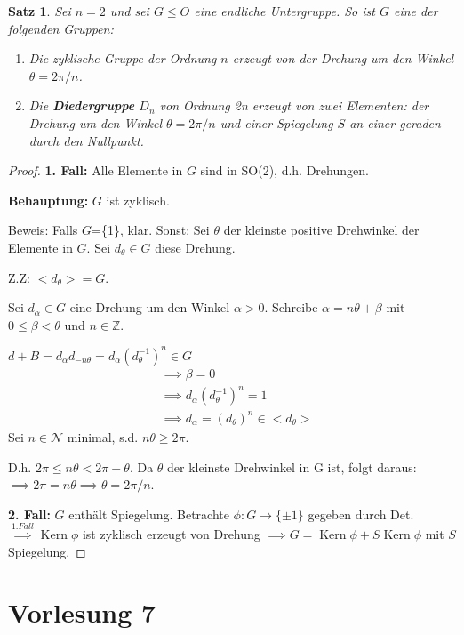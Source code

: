 \documentclass{article}
\theoremstyle{plain}
\newtheorem{theorem}{Satz}
\renewcommand{\ker}{\mathop{\mathrm{Kern}}}
\newcommand{\defn}[1]{\textbf{#1}}
\newcommand{\Z}{\mathbb{Z}}
\newcommand{\N}{\mathcal{N}}
\newcommand{\ug}{\leq}
\newcommand{\zykl}[1]{{<}{#1}{>}}
\begin{document}
\begin{theorem}
    Sei $n=2$ und sei $G\ug O$ eine endliche Untergruppe. 
    So ist $G$ eine der folgenden Gruppen:
    \begin{enumerate}[label=(\alph*)]
        \item Die zyklische Gruppe der Ordnung $n$ erzeugt von der Drehung um den Winkel $\theta=2\pi/n$.
        \item Die \defn{Diedergruppe } $D_n$ von Ordnung 2n erzeugt von zwei Elementen: der Drehung um den Winkel $\theta=2\pi/n$ und einer Spiegelung $S$ an einer geraden durch den Nullpunkt.
    \end{enumerate}
\end{theorem}
\begin{proof}
    \textbf{1. Fall:} Alle Elemente in $G$ sind in SO(2), d.h. Drehungen. %
    
    \textbf{Behauptung:} $G$ ist zyklisch.
    
    Beweis: Falls $G$=\{1\}, klar.
    Sonst: Sei $\theta$ der kleinste positive Drehwinkel der Elemente in $G$. Sei $d_\theta\in G$ diese Drehung.
    
    Z.Z: $\zykl{d_\theta}=G$.

    Sei $d_\alpha\in G$ eine Drehung um den Winkel $\alpha>0$. 
    Schreibe $\alpha=n\theta+\beta$ mit $0\leq\beta<\theta$ und $n\in\Z$.

    $d+B=d_\alpha d_{-n\theta}=d_\alpha(d_\theta^{-1})^n\in G$
    \begin{align*}
        &\implies \beta=0\\
        &\implies d_\alpha(d_\theta^{-1})^n=1\\
        &\implies d_\alpha=(d_\theta)^n\in\zykl{d_\theta}
    \end{align*}
    Sei $n\in\N$ minimal, s.d. $n\theta\geq2\pi$.
    
    D.h. $2\pi\leq n\theta<2\pi+\theta$.
    Da $\theta$ der kleinste Drehwinkel in G ist, folgt daraus:
    $\implies 2\pi=n\theta\implies\theta=2\pi/n$.


    \textbf{2. Fall:} $G$ enthält Spiegelung. Betrachte $\phi\colon G\to\{\pm1\}$ gegeben durch Det.
    $\overset{1. Fall}{\implies} \ker\phi$ ist zyklisch erzeugt von Drehung $\implies G=\ker\phi+S\ker\phi$ mit $S$ Spiegelung.
\end{proof}

\section*{Vorlesung 7}
\end{document}
